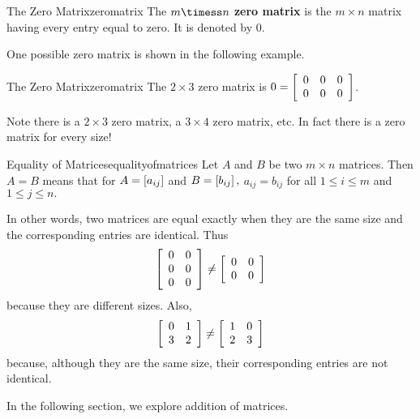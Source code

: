 \begin{definition}{The Zero Matrix}{zeromatrix}
The \textbf{$m\timess n$ zero matrix} is the $m\times n$ matrix
having every entry equal to zero. It is
 denoted by $0.$
\end{definition}

One possible zero matrix is shown in the following example.

\begin{example}{The Zero Matrix}{zeromatrix}
The $2\times 3$ zero matrix is $0= \left[
\begin{array}{ccc}
0 & 0 & 0 \\
0 & 0 & 0
\end{array}
\right] $.
\end{example}

Note there is a $2\times 3$ zero matrix, a $3\times 4$ zero matrix, etc. In
fact there is a zero matrix for every size! 

\begin{definition}{Equality of Matrices}{equalityofmatrices}
 Let $A$ and $B$ be two $m \times n$ matrices. Then $A=B$  means
that for $A=\left[ a_{ij}\right] $
and $B=\left[ b_{ij}\right] ,$ $a_{ij}=b_{ij}$ for all $1\leq i\leq m$ and 
$1\leq j\leq n.$
\end{definition}

In other words, two matrices are equal exactly when they are the same size and the
corresponding entries are identical. Thus
\begin{equation*}
\left[
\begin{array}{rr}
0 & 0 \\
0 & 0 \\
0 & 0
\end{array}
\right] \neq \left[
\begin{array}{rr}
0 & 0 \\
0 & 0
\end{array}
\right]
\end{equation*}
because they are different sizes. 
Also,
\begin{equation*}
\left[
\begin{array}{rr}
0 & 1 \\
3 & 2 
\end{array}
\right] \neq \left[
\begin{array}{rr}
1 & 0 \\
2 & 3
\end{array}
\right]
\end{equation*}
because, although they are the same size, their corresponding entries are not identical.

In the following section, we explore addition of matrices. 
